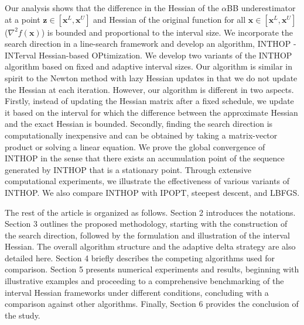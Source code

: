 \documentclass{elsarticle}
\numberwithin{equation}{section}
\begin{document}
Our analysis shows that the difference in the Hessian of the $\alpha$BB underestimator at a point $\mathbf{z}\in[\mathbf{x}^L, \mathbf{x}^U]$ and Hessian of the original function for all $\mathbf{x} \in [\mathbf{x}^L, \mathbf{x}^U]$ ($\nabla^2f(\mathbf{x})$) is bounded and proportional to the interval size. We incorporate the search direction in a line-search framework and develop an algorithm, INTHOP - INTerval Hessian-based OPtimization. We develop two variants of the INTHOP algorithm based on fixed and adaptive interval sizes. Our algorithm is similar in spirit to the Newton method with lazy Hessian updates in that we do not update the Hessian at each iteration. However, our algorithm is different in two aspects. Firstly, instead of updating the Hessian matrix after a fixed schedule, we update it based on the interval for which the difference between the approximate Hessian and the exact Hessian is bounded. Secondly, finding the search direction is computationally inexpensive and can be obtained by taking a matrix-vector product or solving a linear equation. We prove the global convergence of INTHOP in the sense that there exists an accumulation point of the sequence generated by INTHOP that is a stationary point. Through extensive computational experiments, we illustrate the effectiveness of various variants of INTHOP. We also compare INTHOP with { IPOPT}, steepest descent, and  LBFGS. 

The rest of the article is organized as follows. Section 2 introduces the notations. Section 3 outlines the proposed methodology, starting with the construction of the search direction, followed by the formulation and illustration of the interval Hessian. The overall algorithm structure and the adaptive delta strategy are also detailed here. Section 4 briefly describes the competing algorithms used for comparison. Section 5 presents numerical experiments and results, beginning with illustrative examples and proceeding to a comprehensive benchmarking of the interval Hessian frameworks under different conditions, concluding with a comparison against other algorithms. Finally, Section 6 provides the conclusion of the study.
\end{document}
